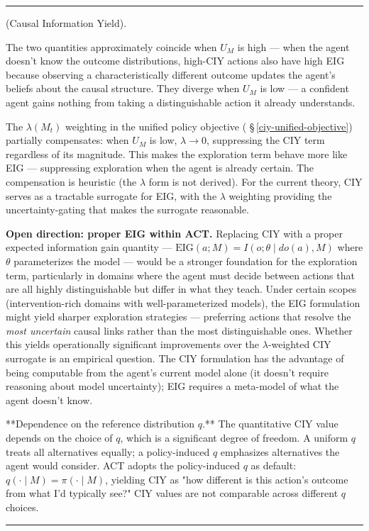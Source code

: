 \documentclass[11pt,oneside]{article}
\newcounter{claim}[section]
\renewcommand{\theclaim}{\thesection.\arabic{claim}}
\newenvironment{segment}[2]{%
  \refstepcounter{claim}%
  \bigskip\noindent\hrule\smallskip
  \noindent{\bfseries #1~\theclaim}\enskip(#2).\par\smallskip
  \noindent\ignorespaces
}{%
  \par\smallskip\noindent\hrule\bigskip
}
\newenvironment{definition}[1][]{\begin{segment}{Definition}{#1}}{\end{segment}}
\begin{document}
\begin{definition}[Causal Information Yield]
The two quantities approximately coincide when $U_M$ is high — when the agent doesn't know the outcome distributions, high-CIY actions also have high EIG because observing a characteristically different outcome updates the agent's beliefs about the causal structure. They diverge when $U_M$ is low — a confident agent gains nothing from taking a distinguishable action it already understands.

The $\lambda(M_t)$ weighting in the unified policy objective ( \S\,\ref{ciy-unified-objective}) partially compensates: when $U_M$ is low, $\lambda \to 0$, suppressing the CIY term regardless of its magnitude. This makes the exploration term behave more like EIG — suppressing exploration when the agent is already certain. The compensation is heuristic (the $\lambda$ form is not derived). For the current theory, CIY serves as a tractable surrogate for EIG, with the $\lambda$ weighting providing the uncertainty-gating that makes the surrogate reasonable.

\textbf{Open direction: proper EIG within ACT.} Replacing CIY with a proper expected information gain quantity — $\text{EIG}(a; M) = I(o; \theta \mid do(a), M)$ where $\theta$ parameterizes the model — would be a stronger foundation for the exploration term, particularly in domains where the agent must decide between actions that are all highly distinguishable but differ in what they teach. Under certain scopes (intervention-rich domains with well-parameterized models), the EIG formulation might yield sharper exploration strategies — preferring actions that resolve the \textit{most uncertain} causal links rather than the most distinguishable ones. Whether this yields operationally significant improvements over the $\lambda$-weighted CIY surrogate is an empirical question. The CIY formulation has the advantage of being computable from the agent's current model alone (it doesn't require reasoning about model uncertainty); EIG requires a meta-model of what the agent doesn't know.

**Dependence on the reference distribution $q$.** The quantitative CIY value depends on the choice of $q$, which is a significant degree of freedom. A uniform $q$ treats all alternatives equally; a policy-induced $q$ emphasizes alternatives the agent would consider. ACT adopts the policy-induced $q$ as default: $q(\cdot \mid M) = \pi(\cdot \mid M)$, yielding CIY as "how different is this action's outcome from what I'd typically see?" CIY values are not comparable across different $q$ choices.


\end{definition}
\end{document}

